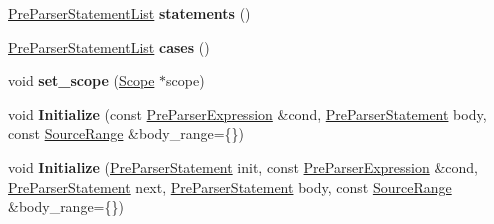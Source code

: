 \begin{DoxyCompactItemize}
\item 
\mbox{\label{classv8_1_1internal_1_1PreParserStatement_a9578a3cf915e40464df62780c2ecb785}} 
\mbox{\hyperlink{classv8_1_1internal_1_1PreParserStatementList}{Pre\+Parser\+Statement\+List}} {\bfseries statements} ()
\item 
\mbox{\label{classv8_1_1internal_1_1PreParserStatement_adb06e95a2aca4b7a80189d756723bfc7}} 
\mbox{\hyperlink{classv8_1_1internal_1_1PreParserStatementList}{Pre\+Parser\+Statement\+List}} {\bfseries cases} ()
\item 
\mbox{\label{classv8_1_1internal_1_1PreParserStatement_a5b65120d83f5f027f9ebf87f62006272}} 
void {\bfseries set\+\_\+scope} (\mbox{\hyperlink{classv8_1_1internal_1_1Scope}{Scope}} $\ast$scope)
\item 
\mbox{\label{classv8_1_1internal_1_1PreParserStatement_a4642826aab0b024c7e805b84cd8246e6}} 
void {\bfseries Initialize} (const \mbox{\hyperlink{classv8_1_1internal_1_1PreParserExpression}{Pre\+Parser\+Expression}} \&cond, \mbox{\hyperlink{classv8_1_1internal_1_1PreParserStatement}{Pre\+Parser\+Statement}} body, const \mbox{\hyperlink{structv8_1_1internal_1_1SourceRange}{Source\+Range}} \&body\+\_\+range=\{\})
\item 
\mbox{\label{classv8_1_1internal_1_1PreParserStatement_ae01bbd488675cc473498c3c444c6e983}} 
void {\bfseries Initialize} (\mbox{\hyperlink{classv8_1_1internal_1_1PreParserStatement}{Pre\+Parser\+Statement}} init, const \mbox{\hyperlink{classv8_1_1internal_1_1PreParserExpression}{Pre\+Parser\+Expression}} \&cond, \mbox{\hyperlink{classv8_1_1internal_1_1PreParserStatement}{Pre\+Parser\+Statement}} next, \mbox{\hyperlink{classv8_1_1internal_1_1PreParserStatement}{Pre\+Parser\+Statement}} body, const \mbox{\hyperlink{structv8_1_1internal_1_1SourceRange}{Source\+Range}} \&body\+\_\+range=\{\})
\end{DoxyCompactItemize}
